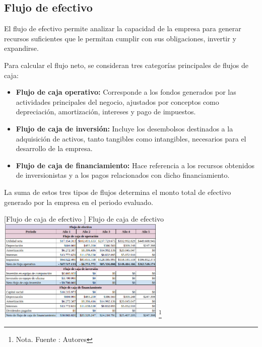 \subsection{Flujo de efectivo}

El flujo de efectivo permite analizar la capacidad de la empresa para generar recursos suficientes que le permitan cumplir con sus obligaciones, invertir y expandirse.

Para calcular el flujo neto, se consideran tres categorías principales de flujos de caja:

\begin{itemize}
    \item \textbf{Flujo de caja operativo: } Corresponde a los fondos generados por las actividades principales del negocio, ajustados por conceptos como depreciación, amortización, intereses y pago de impuestos.
    \item \textbf{Flujo de caja de inversión: } Incluye los desembolsos destinados a la adquisición de activos, tanto tangibles como intangibles, necesarios para el desarrollo de la empresa.
    \item \textbf{Flujo de caja de financiamiento: } Hace referencia a los recursos obtenidos de inversionistas y a los pagos relacionados con dicho financiamiento.
\end{itemize}

La suma de estos tres tipos de flujos determina el monto total de efectivo generado por la empresa en el periodo evaluado.

\vspace{2mm}
\begin{minipage}{0.8\textwidth}
\centering
{}[{Flujo de caja de efectivo }]{ Flujo de caja de efectivo}
\label{flujoOperacional}
\includegraphics[width=0.6\textwidth]{Content/Images/AF/FlujoDeEfectivo.png}
\footnote{Nota. \textup{Fuente : Autores}}
\end{minipage}

